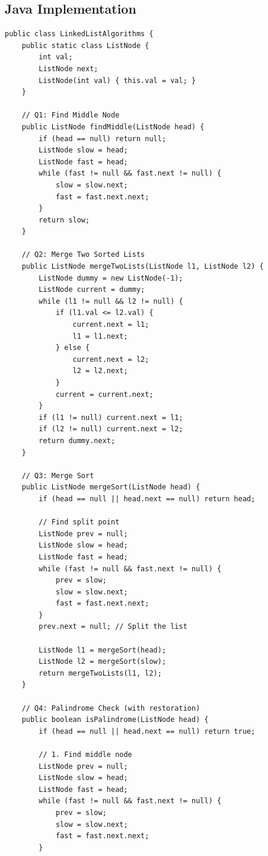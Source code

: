 \documentclass[10pt,journal,compsoc,onecolumn]{IEEEtran}
\begin{document}
\subsection{Java Implementation}
\begin{verbatim}
public class LinkedListAlgorithms {
    public static class ListNode {
        int val;
        ListNode next;
        ListNode(int val) { this.val = val; }
    }

    // Q1: Find Middle Node
    public ListNode findMiddle(ListNode head) {
        if (head == null) return null;
        ListNode slow = head;
        ListNode fast = head;
        while (fast != null && fast.next != null) {
            slow = slow.next;
            fast = fast.next.next;
        }
        return slow;
    }

    // Q2: Merge Two Sorted Lists
    public ListNode mergeTwoLists(ListNode l1, ListNode l2) {
        ListNode dummy = new ListNode(-1);
        ListNode current = dummy;
        while (l1 != null && l2 != null) {
            if (l1.val <= l2.val) {
                current.next = l1;
                l1 = l1.next;
            } else {
                current.next = l2;
                l2 = l2.next;
            }
            current = current.next;
        }
        if (l1 != null) current.next = l1;
        if (l2 != null) current.next = l2;
        return dummy.next;
    }

    // Q3: Merge Sort
    public ListNode mergeSort(ListNode head) {
        if (head == null || head.next == null) return head;
        
        // Find split point
        ListNode prev = null;
        ListNode slow = head;
        ListNode fast = head;
        while (fast != null && fast.next != null) {
            prev = slow;
            slow = slow.next;
            fast = fast.next.next;
        }
        prev.next = null; // Split the list
        
        ListNode l1 = mergeSort(head);
        ListNode l2 = mergeSort(slow);
        return mergeTwoLists(l1, l2);
    }

    // Q4: Palindrome Check (with restoration)
    public boolean isPalindrome(ListNode head) {
        if (head == null || head.next == null) return true;
        
        // 1. Find middle node
        ListNode prev = null;
        ListNode slow = head;
        ListNode fast = head;
        while (fast != null && fast.next != null) {
            prev = slow;
            slow = slow.next;
            fast = fast.next.next;
        }
        

\end{verbatim}
\end{document}
